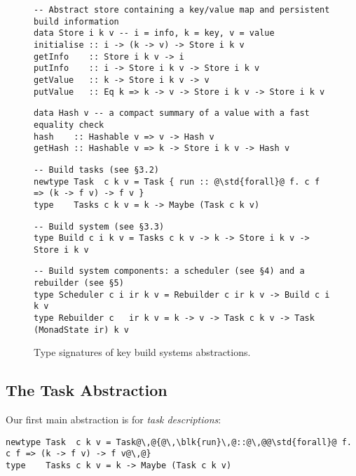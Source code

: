 \begin{figure}
\begin{verbatim}
-- Abstract store containing a key/value map and persistent build information
data Store i k v -- i = info, k = key, v = value
initialise :: i -> (k -> v) -> Store i k v
getInfo    :: Store i k v -> i
putInfo    :: i -> Store i k v -> Store i k v
getValue   :: k -> Store i k v -> v
putValue   :: Eq k => k -> v -> Store i k v -> Store i k v
\end{verbatim}
\begin{verbatim}
data Hash v -- a compact summary of a value with a fast equality check
hash    :: Hashable v => v -> Hash v
getHash :: Hashable v => k -> Store i k v -> Hash v
\end{verbatim}
\begin{verbatim}
-- Build tasks (see §3.2)
newtype Task  c k v = Task { run :: @\std{forall}@ f. c f => (k -> f v) -> f v }
type    Tasks c k v = k -> Maybe (Task c k v)
\end{verbatim}
\begin{verbatim}
-- Build system (see §3.3)
type Build c i k v = Tasks c k v -> k -> Store i k v -> Store i k v
\end{verbatim}
\begin{verbatim}
-- Build system components: a scheduler (see §4) and a rebuilder (see §5)
type Scheduler c i ir k v = Rebuilder c ir k v -> Build c i k v
type Rebuilder c   ir k v = k -> v -> Task c k v -> Task (MonadState ir) k v
\end{verbatim}
\caption{Type signatures of key build systems abstractions.}\label{fig-types}
\end{figure}

\subsection{The Task Abstraction}\label{sec-task}

Our first main abstraction is for \emph{task descriptions}:
\begin{verbatim}
newtype Task  c k v = Task@\,@{@\,\blk{run}\,@::@\,@@\std{forall}@ f. c f => (k -> f v) -> f v@\,@}
type    Tasks c k v = k -> Maybe (Task c k v)
\end{verbatim}

